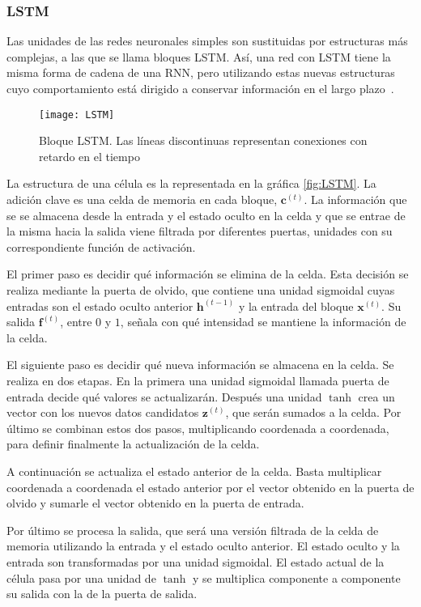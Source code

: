 \subsubsection{LSTM}\label{lstm}

Las unidades de las redes neuronales simples son sustituidas por estructuras más complejas, a las que se llama bloques LSTM. Así, una red con LSTM tiene la misma forma de cadena de una RNN, pero utilizando estas nuevas estructuras cuyo comportamiento está dirigido a conservar información en el largo plazo~\cite{hochreiter1997long}.

\begin{figure}[htpb]
  \centering
  \texttt{[image: LSTM]}
  \caption{Bloque LSTM. Las líneas discontinuas representan conexiones con retardo en el tiempo}
  \label{fig:LSTM}
\end{figure}

La estructura de una célula es la representada en la gráfica \autoref{fig:LSTM}. La adición clave es una celda de memoria en cada bloque, $\textbf{c}^{(t)}$. La información que se se almacena desde la entrada y el estado oculto en la celda y que se entrae de la misma hacia la salida viene filtrada por diferentes puertas, unidades con su correspondiente función de activación.

El primer paso es decidir qué información se elimina de la celda. Esta decisión se realiza mediante la puerta de olvido, que contiene una unidad sigmoidal cuyas entradas son el estado oculto anterior $ \textbf{h}^{(t-1)}$ y la entrada del bloque $\textbf{x}^{(t)}$. Su salida $\textbf{f}^{(t)}$, entre $0$ y $1$, señala con qué intensidad se mantiene la información de la celda.

El siguiente paso es decidir qué nueva información se almacena en la celda. Se realiza en dos etapas. En la primera una unidad sigmoidal llamada puerta de entrada decide qué valores se actualizarán. Después una unidad $\tanh$ crea un vector con los nuevos datos candidatos $\textbf{z}^{(t)}$, que serán sumados a la celda. Por último se combinan estos dos pasos, multiplicando coordenada a coordenada, para definir finalmente la actualización de la celda.

A continuación se actualiza el estado anterior de la celda. Basta multiplicar coordenada a coordenada el estado anterior por el vector obtenido en la puerta de olvido y sumarle el vector obtenido en la puerta de entrada.

Por último se procesa la salida, que será una versión filtrada de la celda de memoria utilizando la entrada y el estado oculto anterior. El estado oculto y la entrada son transformadas por una unidad sigmoidal. El estado actual de la célula pasa por una unidad de $\tanh$ y se multiplica componente a componente su salida con la de la puerta de salida.

